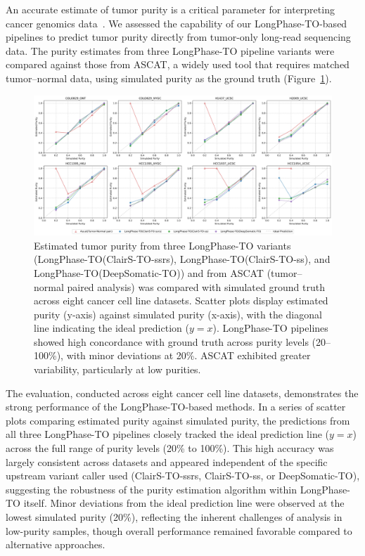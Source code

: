 \documentclass[pdflatex,sn-nature]{sn-jnl}
\def\pandocbounded#1{%
  \begingroup
  \setkeys{Gin}{width=1.0\linewidth,height=1.0\textheight,keepaspectratio}%
  #1%
  \endgroup
}
\begin{document}
An accurate estimate of tumor purity is a critical parameter for interpreting cancer genomics data~\cite{koo2021, zhang2015}. We assessed the capability of our LongPhase-TO-based pipelines to predict tumor purity directly from tumor-only long-read sequencing data. The purity estimates from three LongPhase-TO pipeline variants were compared against those from ASCAT, a widely used tool that requires matched tumor–normal data, using simulated purity as the ground truth (Figure~\ref{fig:met-page-33-cropped-jpg}).

\begin{figure}
\centering
\pandocbounded{\includegraphics[keepaspectratio]{page_33_cropped.jpg}}
\caption[Performance of tumor purity estimation pipelines]{Estimated tumor purity from three LongPhase-TO variants (LongPhase-TO(ClairS-TO-ssrs), LongPhase-TO(ClairS-TO-ss), and LongPhase-TO(DeepSomatic-TO)) and from ASCAT (tumor–normal paired analysis) was compared with simulated ground truth across eight cancer cell line datasets. Scatter plots display estimated purity (y-axis) against simulated purity (x-axis), with the diagonal line indicating the ideal prediction ($y=x$). LongPhase-TO pipelines showed high concordance with ground truth across purity levels (20–100\%), with minor deviations at 20\%. ASCAT exhibited greater variability, particularly at low purities.}
\label{fig:met-page-33-cropped-jpg}
\end{figure}

The evaluation, conducted across eight cancer cell line datasets, demonstrates the strong performance of the LongPhase-TO-based methods. In a series of scatter plots comparing estimated purity against simulated purity, the predictions from all three LongPhase-TO pipelines closely tracked the ideal prediction line ($y=x$) across the full range of purity levels (20\% to 100\%). This high accuracy was largely consistent across datasets and appeared independent of the specific upstream variant caller used (ClairS-TO-ssrs, ClairS-TO-ss, or DeepSomatic-TO), suggesting the robustness of the purity estimation algorithm within LongPhase-TO itself. Minor deviations from the ideal prediction line were observed at the lowest simulated purity (20\%), reflecting the inherent challenges of analysis in low-purity samples, though overall performance remained favorable compared to alternative approaches.
\end{document}
